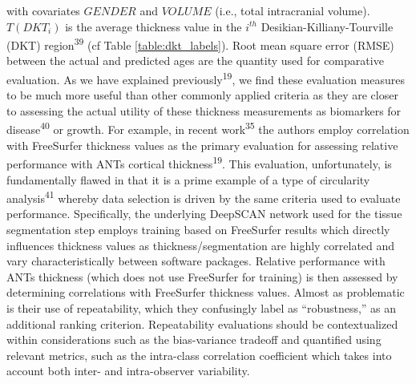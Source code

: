 \documentclass[12pt,]{article}
\begin{document}
with covariates \(GENDER\) and \(VOLUME\) (i.e., total intracranial
volume). \(T(DKT_i)\) is the average thickness value in the \(i^{th}\)
Desikian-Killiany-Tourville (DKT) region\textsuperscript{39} (cf Table
\ref{table:dkt_labels}). Root mean square error (RMSE) between the
actual and predicted ages are the quantity used for comparative
evaluation. As we have explained previously\textsuperscript{19}, we find
these evaluation measures to be much more useful than other commonly
applied criteria as they are closer to assessing the actual utility of
these thickness measurements as biomarkers for
disease\textsuperscript{40} or growth. For example, in recent
work\textsuperscript{35} the authors employ correlation with FreeSurfer
thickness values as the primary evaluation for assessing relative
performance with ANTs cortical thickness\textsuperscript{19}. This
evaluation, unfortunately, is fundamentally flawed in that it is a prime
example of a type of circularity analysis\textsuperscript{41} whereby
data selection is driven by the same criteria used to evaluate
performance. Specifically, the underlying DeepSCAN network used for the
tissue segmentation step employs training based on FreeSurfer results
which directly influences thickness values as thickness/segmentation are
highly correlated and vary characteristically between software packages.
Relative performance with ANTs thickness (which does not use FreeSurfer
for training) is then assessed by determining correlations with
FreeSurfer thickness values. Almost as problematic is their use of
repeatability, which they confusingly label as ``robustness,'' as an
additional ranking criterion. Repeatability evaluations should be
contextualized within considerations such as the bias-variance tradeoff
and quantified using relevant metrics, such as the intra-class
correlation coefficient which takes into account both inter- and
intra-observer variability.
\end{document}
